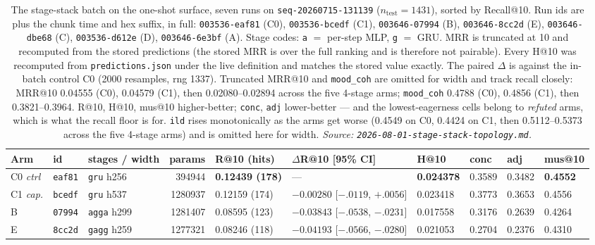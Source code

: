 \documentclass[11pt]{article}
\newcommand{\runid}[1]{\texttt{\small\seqsplit{#1}}}
\newcommand{\dsid}[1]{\texttt{\small #1}}
\newcommand{\best}[1]{\textbf{#1}}
\begin{document}
\begin{table}[ht]
  \centering
  \caption{The stage-stack batch on the one-shot surface, seven runs on
  \dsid{seq-20260715-131139} ($n_{\mathrm{test}}=\num{1431}$), sorted by
  Recall@10. Run ids are \protect\runid{run-20260801-} plus the chunk time and hex
  suffix, in full: \texttt{003536-eaf81} (C0), \texttt{003536-bcedf} (C1),
  \texttt{003646-07994} (B), \texttt{003646-8cc2d} (E), \texttt{003646-dbe68} (C),
  \texttt{003536-d612e} (D), \texttt{003646-6e3bf} (A). Stage codes: \texttt{a}
  $=$ per-step MLP, \texttt{g} $=$ GRU. MRR is truncated at \num{10} and
  recomputed from the stored predictions (the stored MRR is over the full ranking
  and is therefore not pairable). Every H@10 was recomputed from
  \texttt{predictions.json} under the live definition and matches the stored value
  exactly. The paired $\Delta$ is against the in-batch control C0 (\num{2000}
  resamples, rng \num{1337}). Truncated MRR@10 and \texttt{mood\_coh} are omitted
  for width and track recall closely: MRR@10 \num{0.04555} (C0), \num{0.04579}
  (C1), then \numrange{0.02080}{0.02894} across the five 4-stage arms;
  \texttt{mood\_coh} \num{0.4788} (C0), \num{0.4856} (C1), then
  \numrange{0.3821}{0.3964}. R@10, H@10, mus@10
  higher-better; \texttt{conc}, \texttt{adj} lower-better --- and the
  lowest-eagerness cells belong to \emph{refuted} arms, which is what the recall
  floor is for. \texttt{ild} rises monotonically as the arms get worse
  (\num{0.4549} on C0, \num{0.4424} on C1, then \numrange{0.5112}{0.5373} across
  the five 4-stage arms) and is omitted here for width.
  \emph{Source: \texttt{2026-08-01-stage-stack-topology.md}.}}
  \label{tab:stagestack-s1}
  {\scriptsize\setlength{\tabcolsep}{2.0pt}\begin{tabular}{lllrllllll}
    \toprule
    Arm & id & stages / width & params & R@10 (hits) & $\Delta$R@10 [95\% CI] & H@10 & conc & adj & mus@10 \\
    \midrule
    C0 \emph{ctrl} & \texttt{eaf81} & \texttt{gru} h256 & \num{394944} & \best{0.12439 (178)} & --- & \best{0.024378} & 0.3589 & 0.3482 & \best{0.4552} \\
    C1 \emph{cap.} & \texttt{bcedf} & \texttt{gru} h537 & \num{1280937} & 0.12159 (174) & $-0.00280$ [$-.0119$, $+.0056$] & 0.023418 & 0.3773 & 0.3653 & 0.4556 \\
    B & \texttt{07994} & \texttt{agga} h299 & \num{1281407} & 0.08595 (123) & $-0.03843$ [$-.0538$, $-.0231$] & 0.017558 & 0.3176 & 0.2639 & 0.4264 \\
    E & \texttt{8cc2d} & \texttt{gagg} h259 & \num{1277321} & 0.08246 (118) & $-0.04193$ [$-.0566$, $-.0280$] & 0.021053 & 0.2704 & 0.2376 & 0.4310 \\

\end{tabular}}
\end{table}
\end{document}
